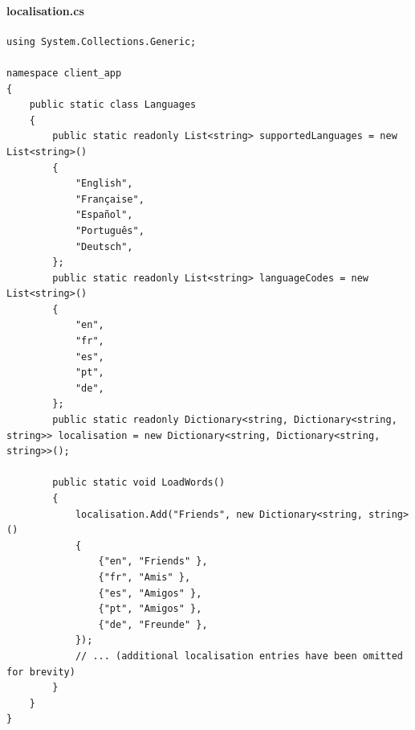 \documentclass{article}
\begin{document}
\paragraph{localisation.cs}\label{client/localisation.cs}
\begin{verbatim}
using System.Collections.Generic;

namespace client_app
{
	public static class Languages
	{
		public static readonly List<string> supportedLanguages = new List<string>()
		{
			"English",
			"Française",
			"Español",
			"Português",
			"Deutsch",
		};
		public static readonly List<string> languageCodes = new List<string>()
		{
			"en",
			"fr",
			"es",
			"pt",
			"de",
		};
		public static readonly Dictionary<string, Dictionary<string, string>> localisation = new Dictionary<string, Dictionary<string, string>>();

		public static void LoadWords()
		{
			localisation.Add("Friends", new Dictionary<string, string>()
			{
				{"en", "Friends" },
				{"fr", "Amis" },
				{"es", "Amigos" },
				{"pt", "Amigos" },
				{"de", "Freunde" },
			});
			// ... (additional localisation entries have been omitted for brevity)
		}
	}
}
\end{verbatim}
\end{document}
